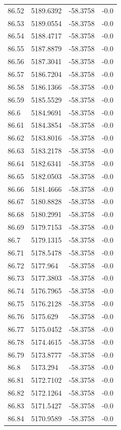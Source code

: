\begin{table}[H]
\begin{tabular}{llll}
86.52 & 5189.6392 & -58.3758 & -0.0 \\
86.53 & 5189.0554 & -58.3758 & -0.0 \\
86.54 & 5188.4717 & -58.3758 & -0.0 \\
86.55 & 5187.8879 & -58.3758 & -0.0 \\
86.56 & 5187.3041 & -58.3758 & -0.0 \\
86.57 & 5186.7204 & -58.3758 & -0.0 \\
86.58 & 5186.1366 & -58.3758 & -0.0 \\
86.59 & 5185.5529 & -58.3758 & -0.0 \\
86.6 & 5184.9691 & -58.3758 & -0.0 \\
86.61 & 5184.3854 & -58.3758 & -0.0 \\
86.62 & 5183.8016 & -58.3758 & -0.0 \\
86.63 & 5183.2178 & -58.3758 & -0.0 \\
86.64 & 5182.6341 & -58.3758 & -0.0 \\
86.65 & 5182.0503 & -58.3758 & -0.0 \\
86.66 & 5181.4666 & -58.3758 & -0.0 \\
86.67 & 5180.8828 & -58.3758 & -0.0 \\
86.68 & 5180.2991 & -58.3758 & -0.0 \\
86.69 & 5179.7153 & -58.3758 & -0.0 \\
86.7 & 5179.1315 & -58.3758 & -0.0 \\
86.71 & 5178.5478 & -58.3758 & -0.0 \\
86.72 & 5177.964 & -58.3758 & -0.0 \\
86.73 & 5177.3803 & -58.3758 & -0.0 \\
86.74 & 5176.7965 & -58.3758 & -0.0 \\
86.75 & 5176.2128 & -58.3758 & -0.0 \\
86.76 & 5175.629 & -58.3758 & -0.0 \\
86.77 & 5175.0452 & -58.3758 & -0.0 \\
86.78 & 5174.4615 & -58.3758 & -0.0 \\
86.79 & 5173.8777 & -58.3758 & -0.0 \\
86.8 & 5173.294 & -58.3758 & -0.0 \\
86.81 & 5172.7102 & -58.3758 & -0.0 \\
86.82 & 5172.1264 & -58.3758 & -0.0 \\
86.83 & 5171.5427 & -58.3758 & -0.0 \\
86.84 & 5170.9589 & -58.3758 & -0.0 \\

\end{tabular}
\end{table}
